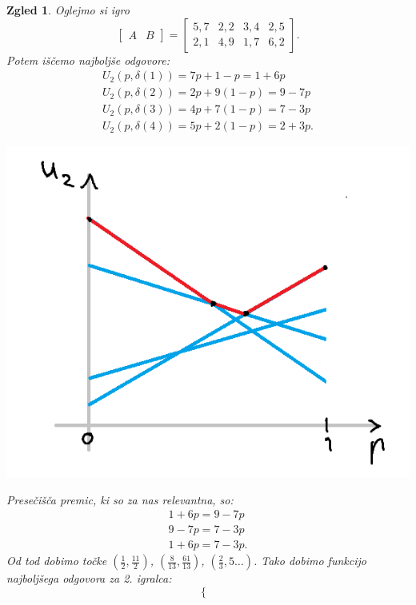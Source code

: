 \documentclass[10pt, a4paper]{article}
\newtheorem{zgled}[izr]{Zgled}
\begin{document}
\begin{zgled}
  Oglejmo si igro
  $$\begin{bmatrix}
    A & B
  \end{bmatrix} = 
  \begin{bmatrix}
    5, 7 & 2, 2 & 3, 4 & 2, 5\\
    2, 1 & 4, 9 & 1, 7 & 6, 2
  \end{bmatrix}.$$
  Potem iščemo najboljše odgovore:
  \begin{gather*}
    U_2 (p, \delta(1)) = 7p + 1 - p = 1 + 6p\\
    U_2 (p, \delta(2)) = 2p + 9(1 - p) = 9 - 7p\\
    U_2 (p, \delta(3)) = 4p + 7(1 - p) = 7 - 3p\\
    U_2 (p, \delta(4)) = 5p + 2(1 - p) = 2 + 3p.
  \end{gather*}
  \begin{center}
    \includegraphics[scale=0.8]{graf2.png}
  \end{center}
  Presečišča premic, ki so za nas relevantna, so:
  \begin{gather*}
    1 + 6p = 9 - 7p\\
    9 - 7p = 7 - 3p\\
    1 + 6p = 7 - 3p.
  \end{gather*}
  Od tod dobimo točke $\left(\frac{1}{2}, \frac{11}{2}\right)$,
  $\left(\frac{8}{13}, \frac{61}{13}\right)$, $\left(\frac{2}{3}, 5\dots\right)$.
  Tako dobimo funkcijo najboljšega odgovora za 2. igralca:
  $$
  \begin{cases}

\end{cases}$$
\end{zgled}
\end{document}
